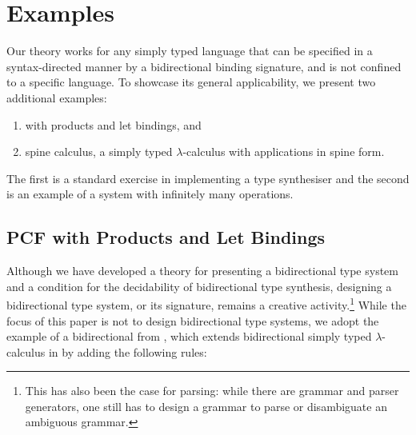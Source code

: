
\section{Examples}\label{sec:example}
Our theory works for any simply typed language that can be specified in a syntax-directed manner by a bidirectional binding signature, and is not confined to a specific language.
To showcase its general applicability, we present two additional examples:
\begin{enumerate}
\item \PCF with products and let bindings, and
\item spine calculus, a simply typed $\lambda$-calculus with applications in spine form.
\end{enumerate}
The first is a standard exercise in implementing a type synthesiser and the second is an example of a system with infinitely many operations.

\subsection{PCF with Products and Let Bindings}\label{subsec:PCF}
Although we have developed a theory for presenting a bidirectional type system and a condition for the decidability of bidirectional type synthesis, designing a bidirectional type system, or its signature, remains a creative activity.\footnote{This has also been the case for parsing: while there are grammar and parser generators, one still has to design a grammar to parse or disambiguate an ambiguous grammar.}
While the focus of this paper is not to design bidirectional type systems, we adopt the example of a bidirectional \PCF from \citet{Wadler2022}, which extends bidirectional simply typed $\lambda$-calculus in  by adding the following rules:
\bgroup
\small
\egroup

